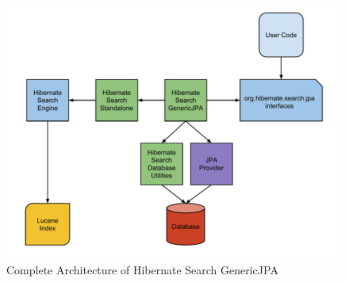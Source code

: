 \begin{figure}[ht]
	\centering
	\includegraphics[scale=0.5]{images/hibernate_search_genericjpa_complete_architecture.pdf}
	\caption{Complete Architecture of Hibernate Search GenericJPA}
	\label{hibernate_search_genericjpa_complete_architecture}
\end{figure}

\pagebreak

%
%


